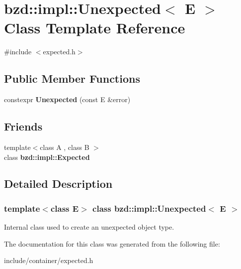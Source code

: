 \hypertarget{classbzd_1_1impl_1_1Unexpected}{}\section{bzd\+:\+:impl\+:\+:Unexpected$<$ E $>$ Class Template Reference}
\label{classbzd_1_1impl_1_1Unexpected}


{\ttfamily \#include $<$expected.\+h$>$}

\subsection*{Public Member Functions}
\begin{DoxyCompactItemize}
\item 
\mbox{\label{classbzd_1_1impl_1_1Unexpected_a8b5c840cdbc12d8f198a885b349a62b5}} 
constexpr {\bfseries Unexpected} (const E \&error)
\end{DoxyCompactItemize}
\subsection*{Friends}
\begin{DoxyCompactItemize}
\item 
\mbox{\label{classbzd_1_1impl_1_1Unexpected_a71e1d1934a6884833bffc9179b910a0f}} 
{\footnotesize template$<$class A , class B $>$ }\\class {\bfseries bzd\+::impl\+::\+Expected}
\end{DoxyCompactItemize}


\subsection{Detailed Description}
\subsubsection*{template$<$class E$>$\newline
class bzd\+::impl\+::\+Unexpected$<$ E $>$}

Internal class used to create an unexpected object type. 

The documentation for this class was generated from the following file\+:\begin{DoxyCompactItemize}
\item 
include/container/expected.\+h\end{DoxyCompactItemize}
